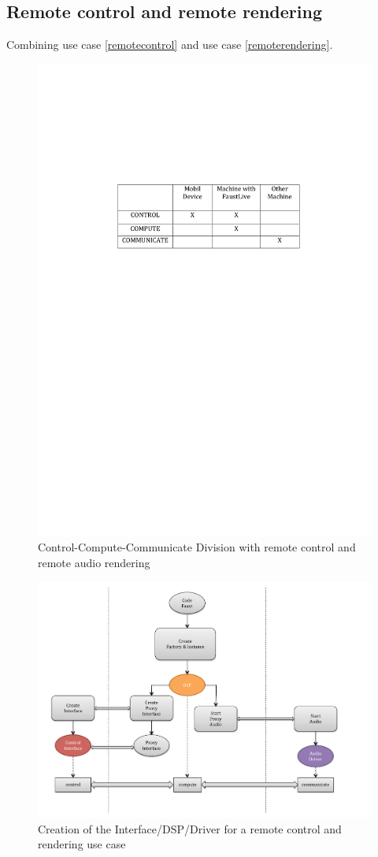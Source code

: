 \documentclass[a4paper]{article}
\begin{document}
\subsection{ Remote control and remote rendering}

Combining use case {\ref{remotecontrol}} and use case {\ref{remoterendering}}.

\begin{figure}[!h]
\begin{center}
\includegraphics[width=0.7\columnwidth]{images/8CCC}
\caption{Control-Compute-Communicate Division with remote control and remote audio rendering}
\label{fig:8CCC}
\end{center}
\end{figure}
\begin{figure}[!h]
\begin{center}
\includegraphics[width=\columnwidth]{images/CCC8}
\caption{Creation of the Interface/DSP/Driver for a remote control and rendering use case}
\label{fig:CCC8}
\end{center}
\end{figure}
\end{document}
